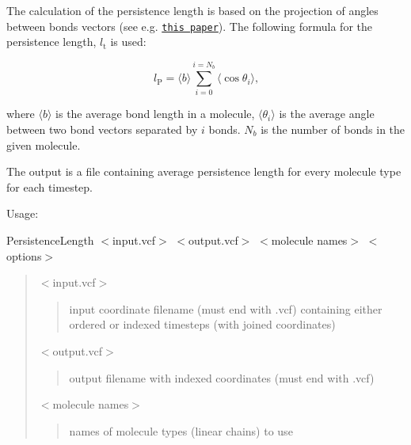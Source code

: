 The calculation of the persistence length is based on the projection of angles between bonds vectors (see e.\+g. \href{http://pubs.acs.org/doi/full/10.1021/ma012052u}{\tt this paper}).  
The following formula for the persistence length, $l_{\mathrm{t}}$ is used:

\begin{equation}
  l_{\mathrm{P}} = \langle b \rangle \sum_{i=0}^{i=N_b} \langle \cos
  \theta_i \rangle \mbox{,}
\end{equation}

where $\langle b \rangle$ is the average bond length in a molecule,
$\langle \theta_i \rangle$ is the average angle between two bond vectors
separated by $i$ bonds. $N_b$ is the number of bonds in the given molecule.


The output is a file containing average persistence length for every molecule type for each timestep.

Usage\+:

{\ttfamily Persistence\+Length $<$input.\+vcf$>$ $<$output.\+vcf$>$ $<$molecule names$>$ $<$options$>$}

\begin{quote}
{\ttfamily $<$input.\+vcf$>$} \begin{quote}
input coordinate filename (must end with {\ttfamily .vcf}) containing either ordered or indexed timesteps (with joined coordinates) \end{quote}
{\ttfamily $<$output.\+vcf$>$} \begin{quote}
output filename with indexed coordinates (must end with {\ttfamily .vcf}) \end{quote}
{\ttfamily $<$molecule names$>$} \begin{quote}
names of molecule types (linear chains) to use\end{quote}
\end{quote}

